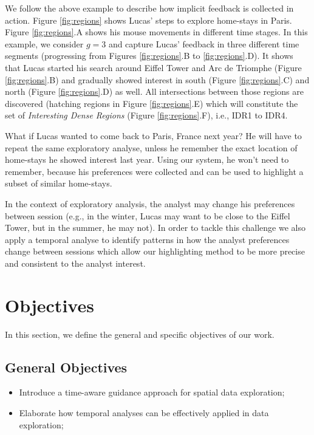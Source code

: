 We follow the above example to describe how implicit feedback is collected in action. Figure \ref{fig:regions} shows Lucas' steps to explore home-stays in Paris. Figure \ref{fig:regions}.A shows his mouse movements in different time stages. In this example, we consider $g = 3$ and capture Lucas' feedback in three different time segments (progressing from Figures \ref{fig:regions}.B to \ref{fig:regions}.D). It shows that Lucas started his search around Eiffel Tower and Arc de Triomphe (Figure \ref{fig:regions}.B) and gradually showed interest in south (Figure \ref{fig:regions}.C) and north (Figure \ref{fig:regions}.D) as well. All intersections between those regions are discovered (hatching regions in Figure \ref{fig:regions}.E) which will constitute the set of {\em Interesting Dense Regions} (Figure \ref{fig:regions}.F), i.e., IDR1 to IDR4.

What if Lucas wanted to come back to Paris, France next year? He will have to repeat the same exploratory analyse, unless he remember the exact location of home-stays he showed interest last year. Using our system, he won't need to remember, because his preferences were collected and can be used to highlight a subset of similar home-stays.

In the context of exploratory analysis, the analyst may change his preferences between session (e.g., in the winter, Lucas may want to be close to the Eiffel Tower, but in the summer, he may not). In order to tackle this challenge we also apply a temporal analyse to identify patterns in how the analyst preferences change between sessions which allow our highlighting method to be more precise and consistent to the analyst interest.

\section{Objectives}

In this section, we define the general and specific objectives of our work.

\subsection{General Objectives}

\begin{itemize}
	\item Introduce a time-aware guidance approach for spatial data exploration;
	\item Elaborate how temporal analyses can be effectively applied in data exploration;
\end{itemize}

